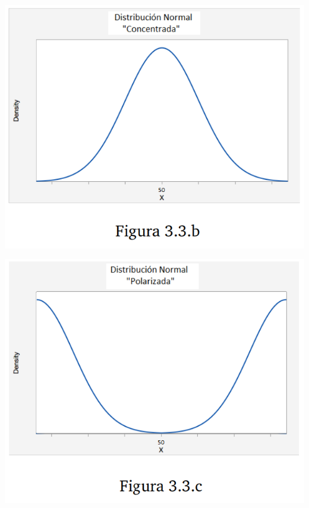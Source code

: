 \documentclass[a4paper]{article}
\begin{document}
\begin{center}
  \centering
  \begin{minipage}[b]{0.4\textwidth}
    \includegraphics[width=\textwidth]{Concentrada2.png}
    
  \end{minipage}
  \hfill
  \begin{minipage}[b]{0.4\textwidth}
    \includegraphics[width=\textwidth]{Polarizada2.png}
   
  \end{minipage}
\end{center}
\end{document}
